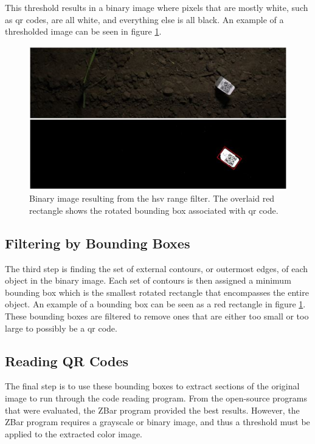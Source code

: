 This threshold results in a binary image where pixels that are mostly white, such as \ac{qr} codes, are all white, and everything else is all black.  An example of a thresholded image can be seen in figure \ref{figure:code_extraction}.

\begin{figure}
	\centering
    \includegraphics[width=5in]{figures/code_extraction_step1.jpg}
    \caption[Thresholded image]{Binary image resulting from the \ac{hsv} range filter.  The overlaid red rectangle shows the rotated bounding box associated with \ac{qr} code.}
    \label{figure:code_extraction}
\end{figure} 

\subsection{Filtering by Bounding Boxes}

The third step is finding the set of external contours, or outermost edges, of each object in the binary image.  Each set of contours is then assigned a minimum bounding box which is the smallest rotated rectangle that encompasses the entire object.  An example of a bounding box can be seen as a red rectangle in figure \ref{figure:code_extraction}.  These bounding boxes are filtered to remove ones that are either too small or too large to possibly be a \ac{qr} code.

\subsection{Reading QR Codes}
\label{section:reading_codes}

The final step is to use these bounding boxes to extract sections of the original image to run through the code reading program.  From the open-source programs that were evaluated, the ZBar program provided the best results.  However, the ZBar program requires a grayscale or binary image, and thus a threshold must be applied to the extracted color image. 

